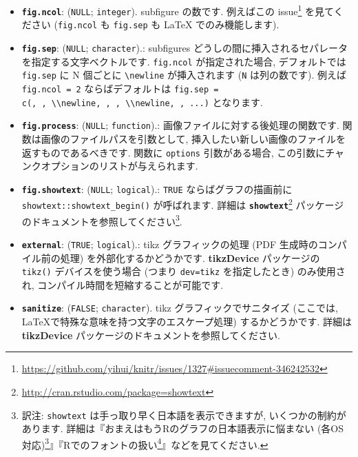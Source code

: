 \documentclass[
  11pt,
  lualatex,ja=standard,jafont=noto]{bxjsreport}
\renewcommand{\href}[2]{#2\footnote{\url{#1}}}
\begin{document}
\begin{itemize}
  \textbf{\texttt{fig.subcap}}: (\texttt{NULL}).: subfigures のためのキャプションです. 複数のグラフが1つのチャンクにあり, かつ \texttt{fig.subcap} も \texttt{fig.cap} is \texttt{NULL} である場合, \texttt{\textbackslash{}subfloat\{\}} が個別の画像の表示に使われます (この場合はプリアンブルに \texttt{\textbackslash{}usepackage\{subfig\}} と書く必要があります). 具体例は \href{https://github.com/yihui/knitr-examples/blob/master/067-graphics-options.Rnw}{067-graphics-options.Rnw} を参照してください.
\item
  \textbf{\texttt{fig.ncol}}: (\texttt{NULL}; \texttt{integer}). subfigure の数です. 例えば\href{https://github.com/yihui/knitr/issues/1327\#issuecomment-346242532}{この issue} を見てください (\texttt{fig.ncol} も \texttt{fig.sep} も LaTeX でのみ機能します).
\item
  \textbf{\texttt{fig.sep}}: (\texttt{NULL}; \texttt{character}).: subfigures どうしの間に挿入されるセパレータを指定する文字ベクトルです. \texttt{fig.ncol} が指定された場合, デフォルトでは \texttt{fig.sep} に N 個ごとに \texttt{\textbackslash{}newline} が挿入されます (\texttt{N} は列の数です). 例えば \texttt{fig.ncol = 2} ならばデフォルトは \texttt{fig.sep = c(\textquotesingle{}\textquotesingle{},\ \textquotesingle{}\textquotesingle{},\ \textquotesingle{}\textbackslash{}\textbackslash{}newline\textquotesingle{},\ \textquotesingle{}\textquotesingle{},\ \textquotesingle{}\textquotesingle{},\ \textquotesingle{}\textbackslash{}\textbackslash{}newline\textquotesingle{},\ \textquotesingle{}\textquotesingle{},\ ...)} となります.
\item
  \textbf{\texttt{fig.process}}: (\texttt{NULL}; \texttt{function}).: 画像ファイルに対する後処理の関数です. 関数は画像のファイルパスを引数として, 挿入したい新しい画像のファイルを返すものであるべきです. 関数に \texttt{options} 引数がある場合, この引数にチャンクオプションのリストが与えられます.
\item
  \textbf{\texttt{fig.showtext}}: (\texttt{NULL}; \texttt{logical}).: \texttt{TRUE} ならばグラフの描画前に \texttt{showtext::showtext\_begin()} が呼ばれます. 詳細は \href{http://cran.rstudio.com/package=showtext}{\textbf{\texttt{showtext}}} パッケージのドキュメントを参照してください\footnote{訳注: \texttt{showtext} は手っ取り早く日本語を表示できますが, いくつかの制約があります. 詳細は『\href{https://ill-identified.hatenablog.com/entry/2020/10/03/200618}{おまえはもうRのグラフの日本語表示に悩まない (各OS対応)}』『\href{https://oku.edu.mie-u.ac.jp/~okumura/stat/font.html}{Rでのフォントの扱い}』などを見てください.}.
\item
  \textbf{\texttt{external}}: (\texttt{TRUE}; \texttt{logical}).: tikz グラフィックの処理 (PDF 生成時のコンパイル前の処理) を外部化するかどうかです. \textbf{tikzDevice} パッケージの \texttt{tikz()} デバイスを使う場合 (つまり \texttt{dev=\textquotesingle{}tikz\textquotesingle{}} を指定したとき) のみ使用され, コンパイル時間を短縮することが可能です.
\item
  \textbf{\texttt{sanitize}}: (\texttt{FALSE}; \texttt{character}). tikz グラフィックでサニタイズ (ここでは, LaTeXで特殊な意味を持つ文字のエスケープ処理) するかどうかです. 詳細は \textbf{tikzDevice} パッケージのドキュメントを参照してください.
\end{itemize}
\end{document}
